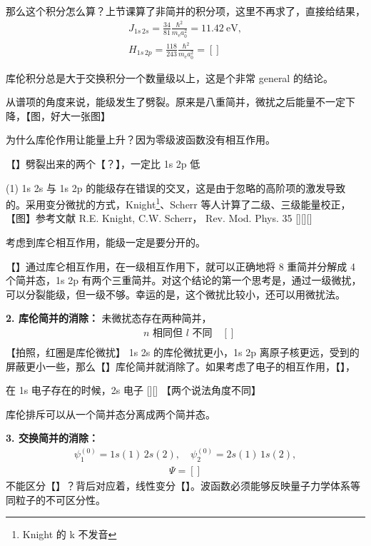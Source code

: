 那么这个积分怎么算？上节课算了非简并的积分项，这里不再求了，直接给结果，
\begin{align}
    J_{1s\,2s} = \frac{34}{81} \frac{\hbar^2}{m_{\mathrm e}a_0^2} = \SI{11.42}{\electronvolt}, \\
    H_{1s\,2p} = \frac{118}{243} \frac{\hbar^2}{m_{\mathrm e}a_0^2} = []
\end{align}

库伦积分总是大于交换积分一个数量级以上，这是个非常 general 的结论。


从谱项的角度来说，能级发生了劈裂。原来是八重简并，微扰之后能量不一定下降，【图，好大一张图】

为什么库伦作用让能量上升？因为零级波函数没有相互作用。

【】劈裂出来的两个【？】，一定比 1s 2p 低

(1) 1s 2s 与 1s 2p 的能级存在错误的交叉，这是由于忽略的高阶项的激发导致的。采用变分微扰的方式，Knight\footnote{Knight 的 k 不发音}、Scherr 等人计算了二级、三级能量校正，【图】参考文献 R.E. Knight, C.W. Scherr， Rev. Mod. Phys. 35 [][][]

考虑到库仑相互作用，能级一定是要分开的。

【】通过库仑相互作用，在一级相互作用下，就可以正确地将 8 重简并分解成 4 个简并态，1s 2p 有两个三重简并。对这个结论的第一个思考是，通过一级微扰，可以分裂能级，但一级不够。幸运的是，这个微扰比较小，还可以用微扰法。

\textbf{2. 库伦简并的消除：}
未微扰态存在两种简并，
\begin{align}
    &\text{$n$ 相同但 $l$ 不同}\quad []\\
\end{align}
【拍照，红圈是库伦微扰】
1s 2s 的库伦微扰更小，1s 2p 离原子核更远，受到的屏蔽更小一些，那么【】库伦简并就消除了。如果考虑了电子的相互作用，【】，

在 1s 电子存在的时候，2s 电子 [][]
【两个说法角度不同】

库伦排斥可以从一个简并态分离成两个简并态。

\textbf{3. 交换简并的消除：}
\begin{align}
    \psi_1^{(0)} = 1s(1)\,2s(2) , \quad 
    \psi_2^{(0)} = 2s(1)\,1s(2),
\end{align}
\begin{align}
    \Psi = []
\end{align}
不能区分【】？背后对应着，线性变分【】。波函数必须能够反映量子力学体系等同粒子的不可区分性。

